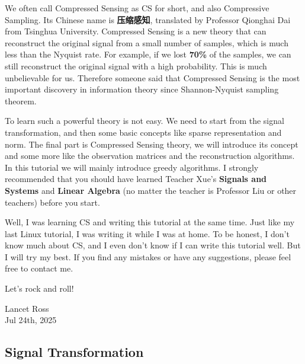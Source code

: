 \documentclass[12pt]{ctexart}
\begin{document}
We often call Compressed Sensing as CS for short, and also Compressive Sampling. Its
Chinese name is \textbf{压缩感知}, translated by Professor Qionghai Dai from Tsinghua
University. Compressed Sensing is a new theory that can reconstruct the original signal
from a small number of samples, which is much less than the Nyquist rate. For example, if
we lost \textbf{70\%} of the samples, we can still reconstruct the original signal with a
high probability. This is much unbelievable for us. Therefore someone said that Compressed
Sensing is the most important discovery in information theory since Shannon-Nyquist
sampling theorem.

To learn such a powerful theory is not easy. We need to start from the signal
transformation, and then some basic concepts like sparse representation and norm. The
final part is Compressed Sensing theory, we will introduce its concept and some
more like the observation matrices and the reconstruction algorithms. In this tutorial
we will mainly introduce greedy algorithms. I strongly recommended that you should have learned Teacher
Xue's \textbf{Signals and Systems} and \textbf{Linear Algebra} (no matter the teacher is 
Professor Liu or other teachers) before you start. 

Well, I was learning CS and writing this tutorial at the same time. Just like my last Linux
tutorial, I was writing it while I was at home. To be honest, I don't know much about CS,
and I even don't know if I can write this tutorial well. But I will try my best. If you find
any mistakes or have any suggestions, please feel free to contact me.

Let's rock and roll!

\begin{flushright}
  Lancet Ross\\
  Jul 24th, 2025
\end{flushright}

\newpage
\thispagestyle{empty}
\begin{center}
    \vspace*{96pt}
    \fontsize{60}{60}\par
    \fontsize{26}{31.2}\section{\textbf{Signal Transformation}}\par %
    \vspace{25pt}
    \fontsize{18}{21.6}\par %
    \vfill
\end{center}
\end{document}
